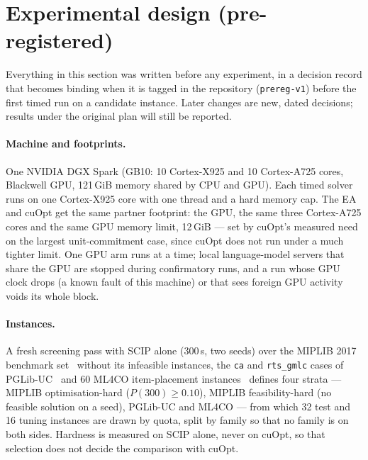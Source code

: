 \section{Experimental design (pre-registered)}\label{sec:design}
Everything in this section was written before any experiment, in a decision record that becomes binding when it is
tagged in the repository (\texttt{prereg-v1}) before the first timed run on a candidate instance. Later changes are
new, dated decisions; results under the original plan will still be reported.

\paragraph{Machine and footprints.} One NVIDIA DGX Spark (GB10: 10 Cortex-X925 and 10 Cortex-A725 cores, Blackwell
GPU, 121\,GiB memory shared by CPU and GPU). Each timed solver runs on one Cortex-X925 core with one thread and a hard
memory cap. The EA and cuOpt get the same partner footprint: the GPU, the same three Cortex-A725 cores and the same GPU
memory limit, 12\,GiB --- set by cuOpt's measured need on the largest unit-commitment case, since cuOpt does not run
under a much tighter limit. One GPU arm runs at a time; local language-model servers that share the GPU are stopped during
confirmatory runs, and a run whose GPU clock drops (a known fault of this machine) or that sees foreign GPU activity
voids its whole block.

\paragraph{Instances.} A fresh screening pass with SCIP alone (300\,s, two seeds) over the MIPLIB 2017 benchmark
set~\citep{gleixner2021miplib} without its infeasible instances, the \texttt{ca} and \texttt{rts\_gmlc} cases of
PGLib-UC~\citep{pglibuc2019,knueven2020uc} and 60 ML4CO item-placement instances~\citep{gasse2022ml4co} defines four
strata --- MIPLIB optimisation-hard ($P(300) \ge 0.10$), MIPLIB feasibility-hard (no feasible solution on a seed),
PGLib-UC and ML4CO --- from which 32 test and 16 tuning instances are drawn by quota, split by family so that no family
is on both sides. Hardness is measured on SCIP alone, never on cuOpt, so that selection does not decide the comparison
with cuOpt. 

